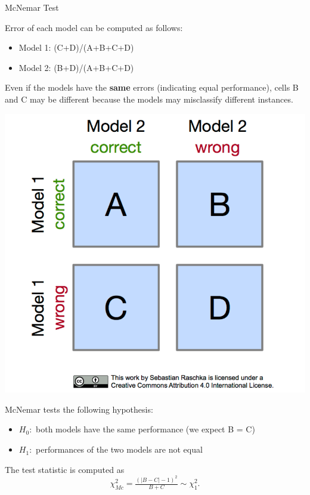 \begin{frame}[c,allowframebreaks]{McNemar Test}
    \framebreak

    \begin{minipage}[c]{0.74\linewidth}
    Error of each model can be computed as follows:
    \begin{itemize}
      \item Model 1: (C+D)/(A+B+C+D)
      \item Model 2: (B+D)/(A+B+C+D)
    \end{itemize}

    Even if the models have the \textbf{same} errors (indicating equal performance), cells B and C may be different because the models may misclassify different instances.
    \end{minipage}
    \begin{minipage}[c]{0.25\linewidth}
        \includegraphics[width=\textwidth]{images/mcnemar_1}
    \end{minipage}

    \medskip

    McNemar tests the following hypothesis:
    \begin{itemize}
    \item $H_0:$ both models have the same performance (we expect B = C)
    \item $H_1:$ performances of the two models are not equal
    \end{itemize}

    The test statistic is computed as
    $$\chi^2_{Mc} =  \tfrac{(|B-C| - 1)^2}{B + C} \sim \chi^2_{1}.$$


\end{frame}

